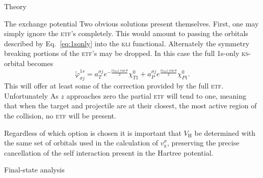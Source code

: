 \documentclass[aps, pra, reprint, groupedaddress, amsfonts,
               amsmath, amssymb, showpacs, nofootinbib]{revtex4-1}
\begin{document}
\begin{section}{Theory \label{sec:theory}}
\begin{subsection}{The exchange potential \label{sec:xpot}}
      Two obvious solutions present themselves. First, one may simply ignore the \textsc{etf}'s
      completely. This would amount to passing the orbitals described by Eq.~\eqref{eq:1sonly} into
      the \textsc{kli} functional. Alternately the symmetry breaking portions of the \textsc{etf}'s
      may be dropped. In this case the full 1s-only \textsc{ks}-orbital becomes
      \begin{equation} \label{eq:1sonlyetf}
         \tilde{\varphi}_{\sigma j}^{1s} =
                       a^{\sigma j}_T e^{- \frac{i v_\mathrm{rel} z \cos \theta}{2}} \chi^{0}_{T1}
                     + a^{\sigma j}_P  e^{\frac{i v_\mathrm{rel} z \cos \theta}{2}}\chi^{0}_{P1}.
      \end{equation}
      This will offer at least some of the correction provided by the full \textsc{etf}. Unfortunately
      As $z$ approaches zero the partial \textsc{etf} will tend to one, meaning that when the target and
      projectile are at their closest, the most active region of the collision, no \textsc{etf} will be
      present. 
      
      Regardless of which option is chosen it is important that $V_\mathrm{H}$ be determined with the
      same set of orbitals used in the calculation of $v_\mathrm{x}^\sigma$, preserving the precise
      cancellation of the self interaction present in the Hartree potential.

   \end{subsection}

   \begin{subsection}{Final-state analysis \label{sec:probs}}


\end{subsection}
\end{section}
\end{document}
